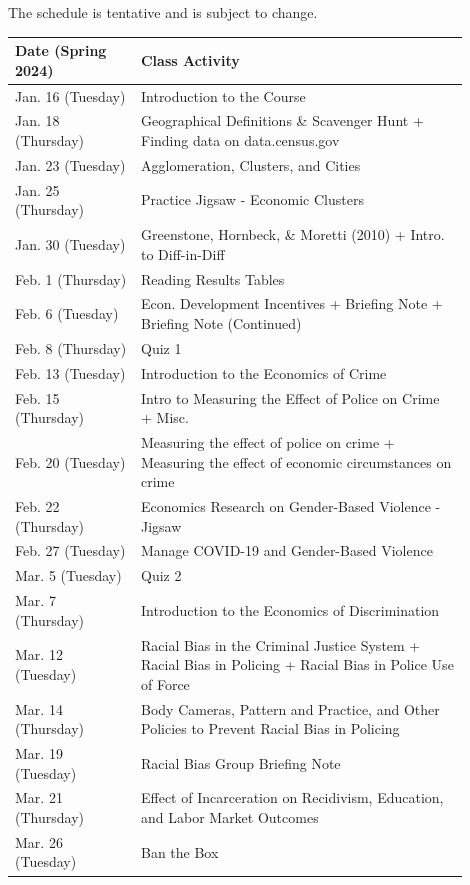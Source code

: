\documentclass[11pt,letterpaper,final]{article}
\begin{document}
The schedule is tentative and is subject to change. 

\begin{table}[H]
\centering
{}
\begin{tabular}{@{}p{0.25\linewidth}p{0.65\linewidth}@{}}
\toprule
\textbf{Date (Spring 2024)} & \textbf{Class Activity} \\
\midrule
Jan. 16 (Tuesday) & Introduction to the Course \\
Jan. 18 (Thursday) & Geographical Definitions \& Scavenger Hunt + Finding data on data.census.gov \\
Jan. 23 (Tuesday) & Agglomeration, Clusters, and Cities \\
Jan. 25 (Thursday) & Practice Jigsaw - Economic Clusters \\
Jan. 30 (Tuesday) & Greenstone, Hornbeck, \& Moretti (2010) + Intro. to Diff-in-Diff \\
Feb. 1 (Thursday) & Reading Results Tables \\
Feb. 6 (Tuesday) & Econ. Development Incentives + Briefing Note + Briefing Note (Continued) \\
Feb. 8 (Thursday) & Quiz 1 \\
Feb. 13 (Tuesday) & Introduction to the Economics of Crime \\
Feb. 15 (Thursday) & Intro to Measuring the Effect of Police on Crime + Misc. \\
Feb. 20 (Tuesday) & Measuring the effect of police on crime + Measuring the effect of economic circumstances on crime \\
Feb. 22 (Thursday) & Economics Research on Gender-Based Violence - Jigsaw \\
Feb. 27 (Tuesday) & Manage COVID-19 and Gender-Based Violence \\
Mar. 5 (Tuesday) & Quiz 2 \\
Mar. 7 (Thursday) & Introduction to the Economics of Discrimination \\
Mar. 12 (Tuesday) & Racial Bias in the Criminal Justice System + Racial Bias in Policing + Racial Bias in Police Use of Force \\
Mar. 14 (Thursday) & Body Cameras, Pattern and Practice, and Other Policies to Prevent Racial Bias in Policing \\
Mar. 19 (Tuesday) & Racial Bias Group Briefing Note \\
Mar. 21 (Thursday) & Effect of Incarceration on Recidivism, Education, and Labor Market Outcomes \\
Mar. 26 (Tuesday) & Ban the Box \\

\end{tabular}
\end{table}
\end{document}
